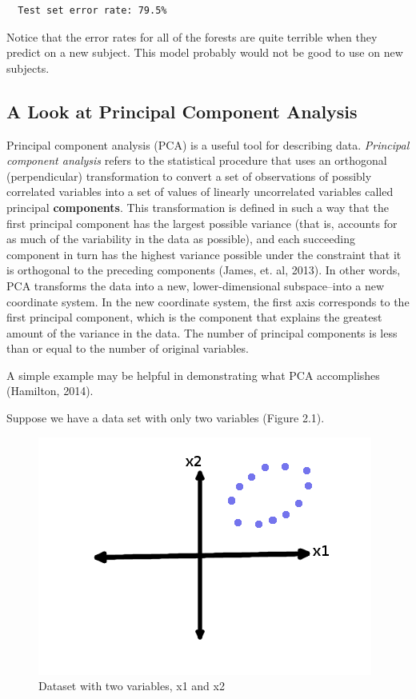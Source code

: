 \documentclass[12pt,twoside]{reedthesis}
\begin{document}
  \begin{verbatim}
  Test set error rate: 79.5%
  \end{verbatim}
  
  Notice that the error rates for all of the forests are quite terrible
  when they predict on a new subject. This model probably would not be
  good to use on new subjects.
  
  \subsection{A Look at Principal Component
  Analysis}\label{a-look-at-principal-component-analysis}
  
  Principal component analysis (PCA) is a useful tool for describing data.
  \emph{Principal component analysis} refers to the statistical procedure
  that uses an orthogonal (perpendicular) transformation to convert a set
  of observations of possibly correlated variables into a set of values of
  linearly uncorrelated variables called principal \textbf{components}.
  This transformation is defined in such a way that the first principal
  component has the largest possible variance (that is, accounts for as
  much of the variability in the data as possible), and each succeeding
  component in turn has the highest variance possible under the constraint
  that it is orthogonal to the preceding components (James, et. al, 2013).
  In other words, PCA transforms the data into a new, lower-dimensional
  subspace--into a new coordinate system. In the new coordinate system,
  the first axis corresponds to the first principal component, which is
  the component that explains the greatest amount of the variance in the
  data. The number of principal components is less than or equal to the
  number of original variables.
  
  A simple example may be helpful in demonstrating what PCA accomplishes
  (Hamilton, 2014).
  
  Suppose we have a data set with only two variables (Figure 2.1).
  
  \begin{figure}[htbp]
  \centering
  \includegraphics{figure/OriginalDataset.png}
  \caption{Dataset with two variables, x1 and x2}
  \end{figure}
  
\end{document}
